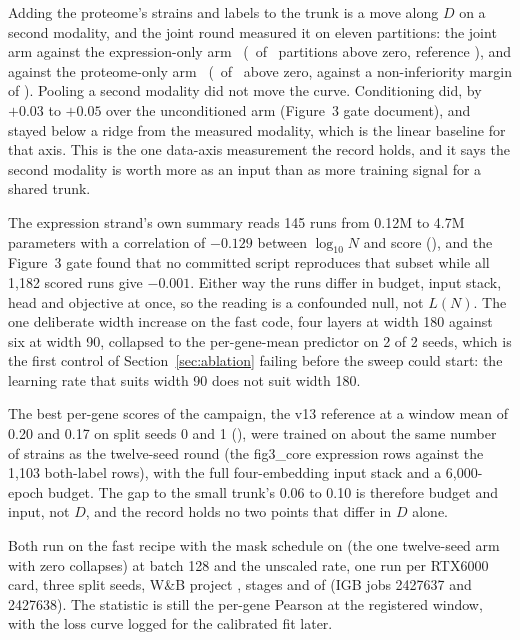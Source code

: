 Adding the proteome's strains and labels to the trunk is a move along $D$ on a second
modality, and the joint round measured it on eleven partitions: the joint arm against
the expression-only arm \jointExprDiff\ (\jointExprPos\ of \jointExprN\ partitions
above zero, reference \jointExprRef), and against the proteome-only arm
\jointProtDiff\ (\jointProtPos\ of \jointExprN\ above zero, against a
non-inferiority margin of \jointProtMargin). Pooling a second modality did not move
the curve. Conditioning did, by $+0.03$ to $+0.05$ over the unconditioned arm
(Figure~3 gate document), and stayed below a ridge from the measured modality, which
is the linear baseline for that axis. This is the one data-axis measurement the record
holds, and it says the second modality is worth more as an input than as more
training signal for a shared trunk.

The expression strand's own summary reads 145 runs from 0.12M to 4.7M parameters
with a correlation of $-0.129$ between $\log_{10} N$ and score
(), and the
Figure~3 gate found that no committed script reproduces that subset while all 1{,}182
scored runs give $-0.001$. Either way the runs differ in budget, input stack, head and
objective at once, so the reading is a confounded null, not $L(N)$. The one deliberate
width increase on the fast code, four layers at width 180 against six at width 90,
collapsed to the per-gene-mean predictor on 2 of 2 seeds, which is the first control
of Section~\ref{sec:ablation} failing before the sweep could start: the learning rate
that suits width 90 does not suit width 180.

The best per-gene scores of the campaign, the v13 reference at a window mean of 0.20
and 0.17 on split seeds 0 and 1 (), were trained on
about the same number of strains as the twelve-seed round (the fig3\_core expression
rows against the 1{,}103 both-label rows), with the full four-embedding input stack
and a 6{,}000-epoch budget. The gap to the small trunk's 0.06 to 0.10 is therefore
budget and input, not $D$, and the record holds no two points that differ in $D$
alone.

Both run on the fast recipe with the mask schedule on (the one twelve-seed arm with
zero collapses) at batch 128 and the unscaled rate, one run per RTX6000 card, three
split seeds, W\&B project , stages  and
 of  (IGB jobs 2427637 and 2427638). The
statistic is still the per-gene Pearson at the registered window, with the loss curve
logged for the calibrated fit later.

